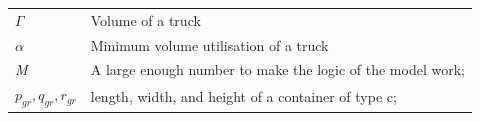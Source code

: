 \begin{longtable}[hbt!]{  |p{}|p{}  |}
  \textit{$\Gamma$}                                                                              & Volume of a truck                                                                                                                                                                                                                                                                                                                                                                                                                                                                                                                                                              \\
  \textit{$\alpha$}                                                                              & Minimum volume utilisation of a truck                                                                                                                                                                                                                                                                                                                                                                                                                                                                                                                                          \\
  \textit{M}                                                                                     & A large enough number to make the logic of the model work;                                                                                                                                                                                                                                                                                                                                                                                                                                                                                                                     \\
  $p_{gr}, q_{gr}, r_{gr}$                                                                       & length, width, and height of a container of type c;                                                                                                                                                                                                                                                                                                                                                                                                                                                                                                                            \\

\end{longtable}
